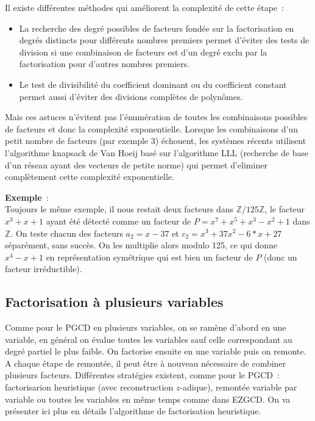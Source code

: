 \documentclass[a4paper,11pt]{article}
\newcommand{\Z}{{\mathbb{Z}}}
\begin{document}
Il existe différentes méthodes
qui améliorent la complexité de cette étape~:
\begin{itemize}
\item La recherche des degré possibles de facteurs fondée sur
la factorisation en degrés distincts pour différents nombres premiers 
permet d'éviter des tests de division si une combinaison de facteurs
est d'un degré exclu par la factorisation pour d'autres nombres premiers.
\item Le test de divisibilité du coefficient dominant ou du coefficient
constant permet aussi d'éviter des divisions complètes de polynômes.
\end{itemize}
Mais ces astuces n'évitent pas l'énumération de toutes les combinaisons
possibles de facteurs et donc la complexité exponentielle. Lorsque
les combinaisons d'un petit nombre de facteurs (par exemple 3)
échouent, les systèmes récents utilisent
l'algorithme knapsack de Van Hoeij basé sur l'algorithme LLL
(recherche de base d'un réseau ayant des vecteurs de petite norme) 
qui permet d'eliminer complètement cette complexité exponentielle.

{\bf Exemple}~:\\ 
Toujours le même exemple, il nous restait deux
facteurs dans $\Z/125 \Z$, le facteur $x^3+x+1$ ayant été
détecté comme un facteur de $P=x^7+x^5+x^3-x^2+1$ dans $\Z$.
On teste chacun des facteurs  $a_2=x-37$ et $c_2=x^3+37x^2-6*x+27$
séparément, sans succès. On les multiplie alors modulo 125,
ce qui donne $x^4-x+1$ en représentation symétrique qui est bien
un facteur de $P$ (donc un facteur irréductible).

\subsection{Factorisation à plusieurs variables}
Comme pour le PGCD en plusieurs variables, on se ramène d'abord en
une variable, en général on évalue toutes les variables sauf celle
correspondant au degré partiel le plus faible. On factorise ensuite
en une variable puis on remonte. A chaque étape de remontée, il peut
être à nouveau nécessaire de combiner plusieurs facteurs. Différentes
stratégies existent, comme pour le PGCD~: factorisarion heuristique
(avec reconstruction $z$-adique), remontée variable par variable
ou toutes les variables en même temps comme dans EZGCD.
On va présenter ici plus en détails l'algorithme de factorisation heuristique.
\end{document}
